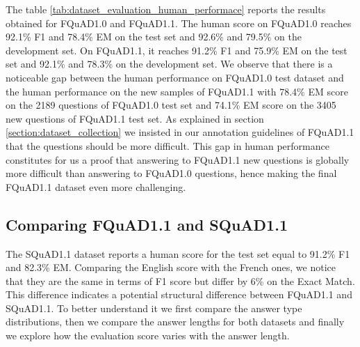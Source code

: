\documentclass{article}
\begin{document}
The table \ref{tab:dataset_evaluation_human_performace} reports the results obtained for FQuAD1.0 and FQuAD1.1.
The human score on FQuAD1.0 reaches 92.1\% F1 and 78.4\% EM on the test set and
92.6\% and 79.5\% on the development set.
On FQuAD1.1, it reaches 91.2\% F1 and 75.9\% EM on the test set and
92.1\% and	78.3\% on the development set.
We observe that there is a noticeable gap between the human performance on FQuAD1.0 test dataset and the human performance on the new samples of FQuAD1.1 with 78.4\% EM score on the 2189 questions of FQuAD1.0 test set and 74.1\% EM score on the 3405 new questions of FQuAD1.1 test set.
As explained in section \ref{section:dataset_collection} we insisted in our annotation guidelines of FQuAD1.1 that the questions should be more difficult. 
This gap in human performance constitutes for us a proof that answering to FQuAD1.1 new questions is globally more difficult than answering to FQuAD1.0 questions, hence making the final FQuAD1.1 dataset even more challenging.

\begin{table}[ht]
    \centering
    \caption{Human Performance on FQuAD}
    \label{tab:dataset_evaluation_human_performace}
\end{table}

\subsection{Comparing FQuAD1.1 and SQuAD1.1}

The SQuAD1.1 dataset \citep{rajpurkar-etal-2016-squad} reports a human score for the test set equal to 91.2\% F1 and 82.3\% EM.
Comparing the English score with the French ones, we notice that they are the same in terms of F1 score but  differ by 6\% on the Exact Match.
This difference indicates a potential structural difference between FQuAD1.1 and SQuAD1.1. 
To better understand it we first compare the answer type distributions, then we compare the answer lengths for both datasets and finally we explore how the evaluation score varies with the answer length.
\end{document}
